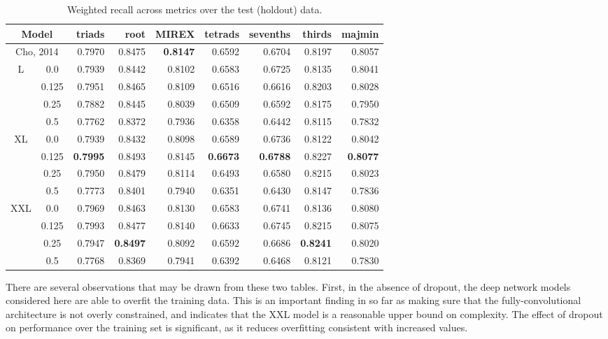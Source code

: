 \begin{table}[t]
\scriptsize
\begin{center}
\caption{Weighted recall across metrics over the test (holdout) data.}
\label{tab:recall_test}
\begin{tabular}{cc|rrrrrrr}

\hline
\multicolumn{2}{c|}{Model}  & triads &   root &   MIREX &   tetrads &   sevenths &   thirds &   majmin \\
\hline
\hline
\multicolumn{2}{c|}{Cho, 2014} &   0.7970 & 0.8475 &  \textbf{0.8147} &    0.6592 &     0.6704 &   0.8197 &   0.8057 \\
\hline
L & 0.0 &   0.7939 & 0.8442 &  0.8102 &    0.6583 &     0.6725 &   0.8135 &   0.8041 \\
  & 0.125 &   0.7951 & 0.8465 &  0.8109 &    0.6516 &     0.6616 &   0.8203 &   0.8028 \\
 & 0.25 &   0.7882 & 0.8445 &  0.8039 &    0.6509 &     0.6592 &   0.8175 &   0.7950 \\
  & 0.5 &   0.7762 & 0.8372 &  0.7936 &    0.6358 &     0.6442 &   0.8115 &   0.7832 \\
\hline
 XL &   0.0 &   0.7939 & 0.8432 &  0.8098 &    0.6589 &     0.6736 &   0.8122 &   0.8042 \\
  &  0.125 &   \textbf{0.7995} & 0.8493 &  0.8145 &    \textbf{0.6673} &     \textbf{0.6788} &   0.8227 &   \textbf{0.8077} \\
  &  0.25 &   0.7950 & 0.8479 &  0.8114 &    0.6493 &     0.6580 &   0.8215 &   0.8023 \\
  &  0.5 &   0.7773 & 0.8401 &  0.7940 &    0.6351 &     0.6430 &   0.8147 &   0.7836 \\
\hline
   XXL & 0.0 &   0.7969 & 0.8463 &  0.8130 &    0.6583 &     0.6741 &   0.8136 &   0.8080 \\
   &  0.125 &   0.7993 & 0.8477 &  0.8140 &    0.6633 &     0.6745 &   0.8215 &   0.8075 \\
   &  0.25 &   0.7947 & \textbf{0.8497} &  0.8092 &    0.6592 &     0.6686 &   \textbf{0.8241} &   0.8020 \\
   &  0.5 &   0.7768 & 0.8369 &  0.7941 &    0.6392 &     0.6468 &   0.8121 &   0.7830 \\
\hline
\end{tabular}
\end{center}
\end{table}

There are several observations that may be drawn from these two tables.
First, in the absence of dropout, the deep network models considered here are able to overfit the training data.
This is an important finding in so far as making sure that the fully-convolutional architecture is not overly constrained, and indicates that the XXL model is a reasonable upper bound on complexity.
The effect of dropout on performance over the training set is significant, as it reduces overfitting consistent with increased values.

